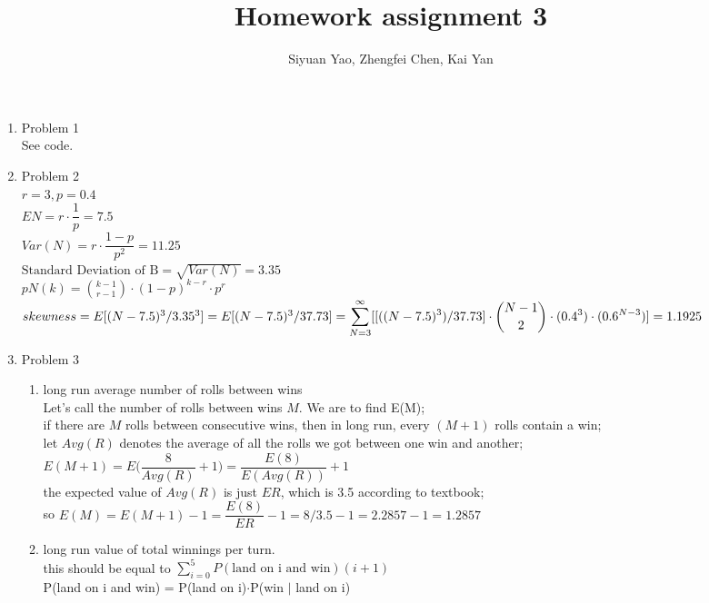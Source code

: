 \documentclass{amsart}
\begin{document}
\title{Homework assignment 3}
\author{Siyuan Yao, Zhengfei Chen, Kai Yan}
\maketitle

\thispagestyle{empty}
\pagestyle{empty}

\begin{enumerate}
\item Problem 1\\
See code.
\item Problem 2\\
$r = 3, p = 0.4$\\
$EN = r\cdot \dfrac{1}{p}=7.5$\\
$Var(N) = r\cdot \dfrac{1-p}{p^2}=11.25$\\
$\text{Standard Deviation of B} = \sqrt{Var(N)}= 3.35$\\
$pN(k) = \displaystyle\binom{k-1}{r-1}\cdot(1-p)^{k-r}\cdot p^r$\\
$skewness = E[(N-7.5)^3 / 3.35^3] = E[(N-7.5)^3/37.73] \\= \displaystyle\sum^\infty_{N=3}[ [((N-7.5)^3) / 37.73]\cdot \binom{N-1}{2} \cdot(0.4^3) \cdot (0.6 ^ {N-3} ) ]= 1.1925$
\item Problem 3\\
\begin{enumerate}
\item long run average number of rolls between wins\\
 Let's call the number of rolls between wins $M$. We are to find E(M);\\
  if there are $M$ rolls between consecutive wins, then in long run, every $(M+1)$ rolls contain a win;\\
  let $Avg(R)$ denotes the average of all the rolls we got between one win and another;\\
  $E(M+1) = E\bigg(\dfrac{8}{Avg(R)}+1\bigg)=\dfrac{E(8)}{ E(Avg(R))} +1$\\
  the expected value of $Avg(R)$ is just $ER$, which is 3.5 according to textbook;\\
so $E(M) = E(M+1) -1 = \dfrac{E(8)}{ER} -1 = 8/3.5 -1 = 2.2857 -1 = 1.2857$
\item long run value of total winnings per turn. \\
  this should be equal to $\displaystyle\sum^5_{i=0}P(\text{land on i and win})(i+1)$\\
  P(land on i and win) = P(land on i)$\cdot$P(win $|$ land on i)\\

\end{enumerate}
\end{enumerate}
\end{document}
